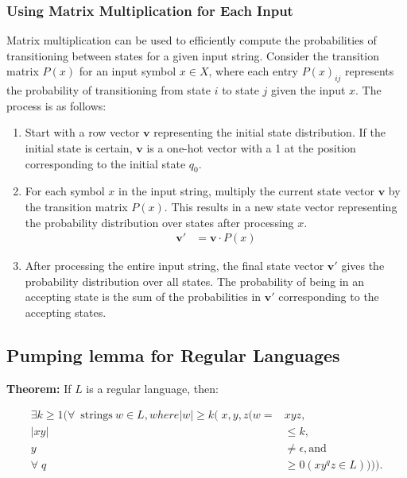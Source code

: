 \documentclass[hidelinks,12pt]{article}
\begin{document}
\subsubsection{Using Matrix Multiplication for Each Input}
Matrix multiplication can be used to efficiently compute the probabilities of
transitioning between states for a given input string. Consider the transition
matrix $P(x)$ for an input symbol $x \in X$, where each entry $P(x)_{ij}$
represents the probability of transitioning from state $i$ to state $j$ given
the input $x$. The process is as follows:

\begin{enumerate}
    \item Start with a row vector $\mathbf{v}$ representing the initial state distribution. If the initial state is certain, $\mathbf{v}$ is a one-hot vector with a 1 at the position corresponding to the initial state $q_0$.
    \item For each symbol $x$ in the input string, multiply the current state vector $\mathbf{v}$ by the transition matrix $P(x)$. This results in a new state vector representing the probability distribution over states after processing $x$.
        \begin{align*}
            \mathbf{v}' &= \mathbf{v} \cdot P(x)
        \end{align*}
    \item After processing the entire input string, the final state vector $\mathbf{v}'$ gives the probability distribution over all states. The probability of being in an accepting state is the sum of the probabilities in $\mathbf{v}'$ corresponding to the accepting states.
\end{enumerate}

\subsection{Pumping lemma for Regular Languages }

\textbf{Theorem:} If $L$ is a regular language, then: 

\begin{align*}
    \exists k \ge 1 ( \forall \>\text{strings} \> w \in L, where |w| \ge k (x, y, z (w = &xyz, \\
    |xy| &\le k, \\
    y &\ne \epsilon, \text{and} \\
    \forallq &\ge 0 (xy^{q}z \in L)))). \\
\end{align*}
 
\end{document}
